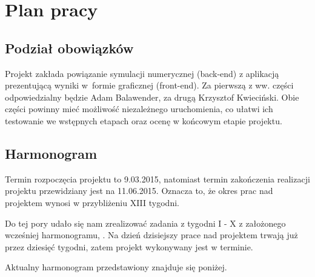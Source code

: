 
\section{Plan pracy}
\subsection{Podział obowiązków}
Projekt zakłada powiązanie symulacji numerycznej (back-end) z aplikacją prezentującą wyniki w~formie graficznej (front-end). Za pierwszą z ww. części odpowiedzialny będzie Adam
Balawender, za drugą Krzysztof Kwieciński. Obie części powinny mieć możliwość niezależnego uruchomienia, co ułatwi ich testowanie we wstępnych etapach oraz ocenę w końcowym etapie projektu.

\subsection{Harmonogram}
Termin rozpoczęcia projektu to 9.03.2015, natomiast termin zakończenia realizacji projektu przewidziany jest na 11.06.2015. Oznacza to, że okres prac nad projektem wynosi w przybliżeniu XIII tygodni.

Do tej pory udało się nam zrealizować zadania z tygodni I - X z założonego wcześniej harmonogramu, \cite{ABKKWstepne}. Na dzień dzisiejszy prace nad projektem trwają już przez dziesięć tygodni, zatem projekt wykonywany jest w terminie. 

Aktualny harmonogram przedstawiony znajduje się poniżej.

